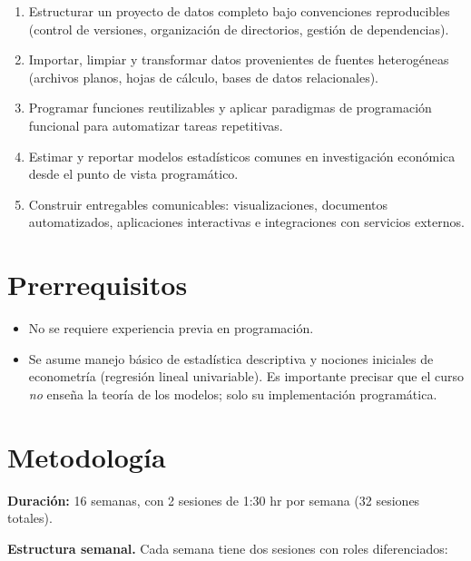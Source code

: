\documentclass[11pt,letterpaper]{article}
\begin{document}
\begin{enumerate}[leftmargin=*]
    \item Estructurar un proyecto de datos completo bajo convenciones reproducibles (control de versiones, organización de directorios, gestión de dependencias).
    \item Importar, limpiar y transformar datos provenientes de fuentes heterogéneas (archivos planos, hojas de cálculo, bases de datos relacionales).
    \item Programar funciones reutilizables y aplicar paradigmas de programación funcional para automatizar tareas repetitivas.
    \item Estimar y reportar modelos estadísticos comunes en investigación económica desde el punto de vista programático.
    \item Construir entregables comunicables: visualizaciones, documentos automatizados, aplicaciones interactivas e integraciones con servicios externos.
\end{enumerate}

\section{Prerrequisitos}

\begin{itemize}[leftmargin=*]
    \item No se requiere experiencia previa en programación.
    \item Se asume manejo básico de estadística descriptiva y nociones iniciales de econometría (regresión lineal univariable). Es importante precisar que el curso \textit{no} enseña la teoría de los modelos; solo su implementación programática.
\end{itemize}

\section{Metodología}

\textbf{Duración:} 16 semanas, con 2 sesiones de 1:30 hr por semana (32 sesiones totales).

\textbf{Estructura semanal.} Cada semana tiene dos sesiones con roles diferenciados:
\end{document}
